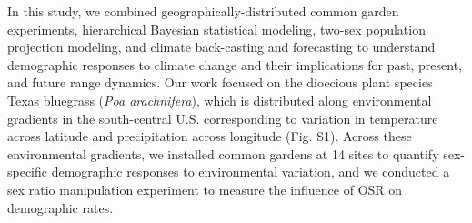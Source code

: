 \documentclass[9pt,twocolumn,twoside,lineno]{pnas-new}
\newcommand{\tom}[2]{{\color{red}{#1}}\footnote{\textit{\color{red}{#2}}}}
\begin{document}
%
In this study,  we combined geographically-distributed common garden experiments, hierarchical Bayesian statistical modeling, two-sex population projection modeling, and climate back-casting and forecasting to understand demographic responses to climate change and their implications for past, present, and future range dynamics. 
Our work focused on the dioecious plant species Texas bluegrass (\textit{Poa arachnifera}), which
is distributed along environmental gradients in the south-central U.S. corresponding to variation in temperature across latitude and precipitation across longitude (Fig. S1). 
Across these environmental gradients, we installed common gardens at 14 sites to quantify sex-specific demographic responses to environmental variation, and we conducted a sex ratio manipulation experiment to measure the influence of OSR on demographic rates.
\end{document}
